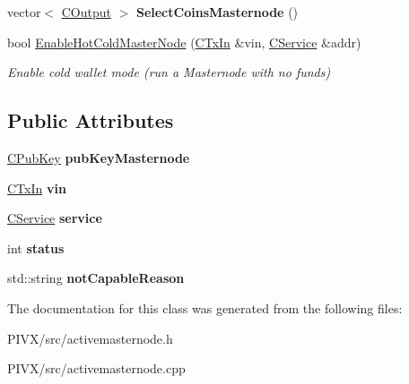 \begin{DoxyCompactItemize}
\mbox{\label{class_c_active_masternode_ac4fc5fb1681bf0a0f3d30e706fb0577a}} 
vector$<$ \mbox{\hyperlink{class_c_output}{C\+Output}} $>$ {\bfseries Select\+Coins\+Masternode} ()
\item 
\mbox{\label{class_c_active_masternode_a2ab446c7b350b9971089c27f83b9ebb0}} 
bool \mbox{\hyperlink{class_c_active_masternode_a2ab446c7b350b9971089c27f83b9ebb0}{Enable\+Hot\+Cold\+Master\+Node}} (\mbox{\hyperlink{class_c_tx_in}{C\+Tx\+In}} \&vin, \mbox{\hyperlink{class_c_service}{C\+Service}} \&addr)
\begin{DoxyCompactList}\small\item\em Enable cold wallet mode (run a Masternode with no funds) \end{DoxyCompactList}\end{DoxyCompactItemize}
\subsection*{Public Attributes}
\begin{DoxyCompactItemize}
\item 
\mbox{\label{class_c_active_masternode_a005f6d9c1e40efd38ab5ceddcb56628b}} 
\mbox{\hyperlink{class_c_pub_key}{C\+Pub\+Key}} {\bfseries pub\+Key\+Masternode}
\item 
\mbox{\label{class_c_active_masternode_a0fe32edc638ebd2866dda14fd490d78e}} 
\mbox{\hyperlink{class_c_tx_in}{C\+Tx\+In}} {\bfseries vin}
\item 
\mbox{\label{class_c_active_masternode_a5b990857c9dc1005d0c134c608474c8f}} 
\mbox{\hyperlink{class_c_service}{C\+Service}} {\bfseries service}
\item 
\mbox{\label{class_c_active_masternode_af43fe0c6da3192458ddc827ff2e0294c}} 
int {\bfseries status}
\item 
\mbox{\label{class_c_active_masternode_a9f70460608657fcbda659b650e2180cd}} 
std\+::string {\bfseries not\+Capable\+Reason}
\end{DoxyCompactItemize}


The documentation for this class was generated from the following files\+:\begin{DoxyCompactItemize}
\item 
P\+I\+V\+X/src/activemasternode.\+h\item 
P\+I\+V\+X/src/activemasternode.\+cpp\end{DoxyCompactItemize}
